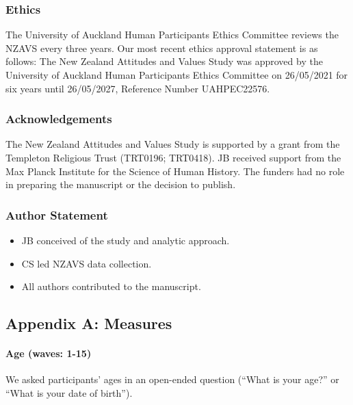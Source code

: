 \documentclass[
  single column]{article}
\let\oldparagraph\paragraph
\renewcommand{\paragraph}[1]{\oldparagraph{#1}\mbox{}}
\providecommand{\tightlist}{%
  \setlength{\itemsep}{0pt}\setlength{\parskip}{0pt}}\usepackage{longtable,booktabs,array}
\begin{document}
\newpage{}

\subsubsection{Ethics}\label{ethics}

The University of Auckland Human Participants Ethics Committee reviews
the NZAVS every three years. Our most recent ethics approval statement
is as follows: The New Zealand Attitudes and Values Study was approved
by the University of Auckland Human Participants Ethics Committee on
26/05/2021 for six years until 26/05/2027, Reference Number UAHPEC22576.

\subsubsection{Acknowledgements}\label{acknowledgements}

The New Zealand Attitudes and Values Study is supported by a grant from
the Templeton Religious Trust (TRT0196; TRT0418). JB received support
from the Max Planck Institute for the Science of Human History. The
funders had no role in preparing the manuscript or the decision to
publish.

\subsubsection{Author Statement}\label{author-statement}

\begin{itemize}
\tightlist
\item
  JB conceived of the study and analytic approach.\\
\item
  CS led NZAVS data collection.
\item
  All authors contributed to the manuscript.
\end{itemize}

\newpage{}

\subsection{Appendix A: Measures}\label{appendix-measures}

\paragraph{Age (waves: 1-15)}\label{age-waves-1-15}

We asked participants' ages in an open-ended question (``What is your
age?'' or ``What is your date of birth'').
\end{document}
